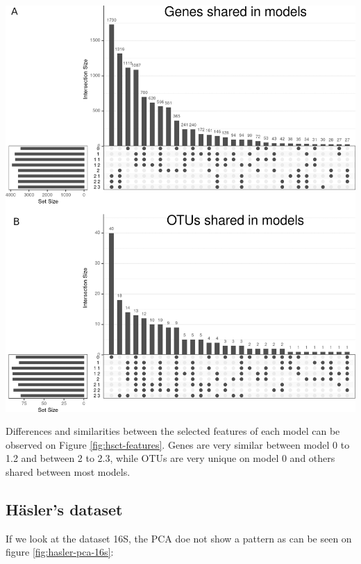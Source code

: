 \documentclass[
  12pt,
  a4paper,
  twoside,
  openright]{book}
\let\origfigure\figure
\let\endorigfigure\endfigure
\renewenvironment{figure}[1][2] {
    \expandafter\origfigure\expandafter[!ht]
} {
    \endorigfigure
}
\begin{document}
\begin{figure}
\includegraphics[width=1\linewidth]{images/hsct-features} \caption[Upset plot of variables selected on HSCT dataset.]{Upset plot of variables selected on HSCT dataset. The variables selected on each model from 0 to 2.3 showing the intersection between them regarding genes, panel A, and OTUs, panel B.}\label{fig:hsct-features}
\end{figure}

Differences and similarities between the selected features of each model can be observed on Figure \ref{fig:hsct-features}.
Genes are very similar between model 0 to 1.2 and between 2 to 2.3, while OTUs are very unique on model 0 and others shared between most models.

\hypertarget{results-hasler}{%
\subsection{Häsler's dataset}\label{results-hasler}}

If we look at the dataset 16S, the PCA doe not show a pattern as can be seen on figure \ref{fig:hasler-pca-16s}:
\end{document}
